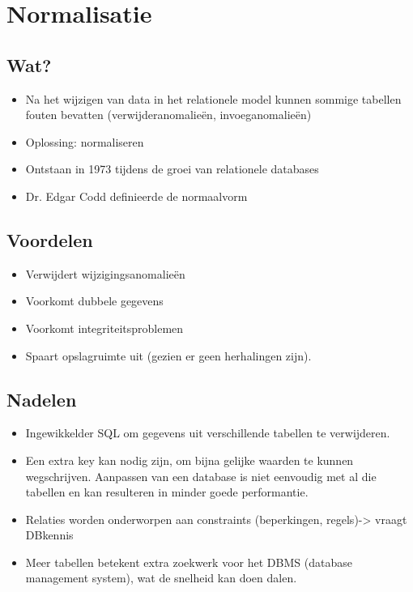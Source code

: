 \documentclass{article}
\begin{document}
\section{Normalisatie}
\subsection{Wat?}
\begin{itemize}
    \item Na het wijzigen van data in het relationele model kunnen sommige tabellen fouten bevatten (verwijderanomalieën, invoeganomalieën)
    \item Oplossing: normaliseren
    \item Ontstaan in 1973 tijdens de groei van relationele databases
    \item Dr. Edgar Codd definieerde de normaalvorm 
\end{itemize}

\subsection{Voordelen}

\begin{itemize}
    \item Verwijdert wijzigingsanomalieën
    \item Voorkomt dubbele gegevens
    \item Voorkomt integriteitsproblemen
    \item Spaart opslagruimte uit (gezien er geen herhalingen zijn).
\end{itemize}

\subsection{Nadelen}

\begin{itemize}
    \item Ingewikkelder SQL om gegevens uit verschillende tabellen te verwijderen.
    \item Een extra key kan nodig zijn, om bijna gelijke waarden te kunnen wegschrijven. Aanpassen van een database is niet eenvoudig met al die tabellen en kan resulteren in minder goede performantie.
    \item Relaties worden onderworpen aan constraints (beperkingen, regels)-> vraagt DBkennis
    \item Meer tabellen betekent extra zoekwerk voor het DBMS (database management system), wat de snelheid kan doen dalen.
\end{itemize}
\end{document}
